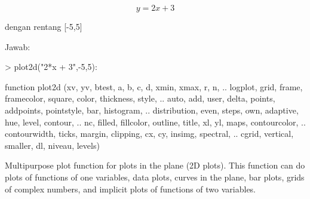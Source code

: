 \documentclass{report}
\begin{document}
\begin{eulernotebook}
\begin{eulercomment}
\begin{eulercomment}
\begin{eulercomment}
\begin{eulercomment}
\begin{eulercomment}
\begin{eulercomment}
\begin{eulercomment}
\end{eulercomment}
\begin{eulerformula}
\[
y = 2x + 3
\]
\end{eulerformula}
\begin{eulercomment}
\end{eulercomment}
\begin{eulerttcomment}
   dengan rentang [-5,5]
\end{eulerttcomment}
\begin{eulercomment}
Jawab:
\end{eulercomment}
\begin{eulerprompt}
> plot2d("2*x + 3",-5,5):
\end{eulerprompt}
\begin{eulercomment}
\end{eulercomment}
\begin{eulerttcomment}
  function plot2d (xv, yv, btest, a, b, c, d, xmin, xmax, r, n,  ..
  logplot, grid, frame, framecolor, square, color, thickness, style, ..
  auto, add, user, delta, points, addpoints, pointstyle, bar, histogram,  ..
  distribution, even, steps, own, adaptive, hue, level, contour,  ..
  nc, filled, fillcolor, outline, title, xl, yl, maps, contourcolor, ..
  contourwidth, ticks, margin, clipping, cx, cy, insimg, spectral,  ..
  cgrid, vertical, smaller, dl, niveau, levels)
\end{eulerttcomment}
\begin{eulercomment}
Multipurpose plot function for plots in the plane (2D plots). This function can do
plots of functions of one variables, data plots, curves in the plane, bar plots, grids
of complex numbers, and implicit plots of functions of two variables.


\end{eulercomment}
\end{eulercomment}
\end{eulercomment}
\end{eulercomment}
\end{eulercomment}
\end{eulercomment}
\end{eulercomment}
\end{eulernotebook}
\end{document}
